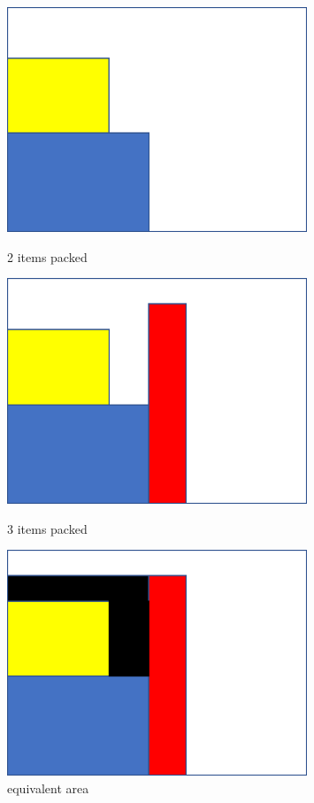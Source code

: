 \documentclass[11pt]{article}
\begin{document}
        \begin{figure}
        \begin{minipage}[hb]{0.33\linewidth}
        \centering
        \includegraphics[width=0.8\textwidth]{FIGS/examples/2.png}
        \caption{2 items packed}
        \label{skyline}
        \end{minipage}
        \begin{minipage}[hb]{0.33\linewidth}
        \centering
        \includegraphics[width=0.8\textwidth]{FIGS/examples/3.png}
        \caption{3 items packed}
        \label{skyline}
        \end{minipage}
        \begin{minipage}[hb]{0.33\linewidth}
        \centering
        \includegraphics[width=0.8\textwidth]{FIGS/examples/4.png}
        \caption{equivalent area }
        \label{skyline}
        \end{minipage}
        \end{figure}
\end{document}
